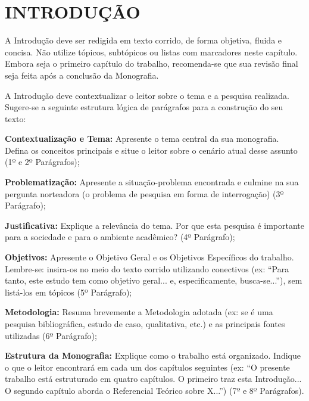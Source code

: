 \chapter{INTRODUÇÃO}
A Introdução deve ser redigida em texto corrido, de forma objetiva, fluida e concisa. Não utilize tópicos, subtópicos ou listas com marcadores neste capítulo. Embora seja o primeiro capítulo do trabalho, recomenda-se que sua revisão final seja feita após a conclusão da Monografia.

A Introdução deve contextualizar o leitor sobre o tema e a pesquisa realizada. Sugere-se a seguinte estrutura lógica de parágrafos para a construção do seu texto:
\begin{uemaenum}
    \item \textbf{Contextualização e Tema:} Apresente o tema central da sua monografia. Defina os conceitos principais e situe o leitor sobre o cenário atual desse assunto (1º e 2º Parágrafos);
    \item \textbf{Problematização:} Apresente a situação-problema encontrada e culmine na sua pergunta norteadora (o problema de pesquisa em forma de interrogação) (3º Parágrafo);
    \item \textbf{Justificativa:} Explique a relevância do tema. Por que esta pesquisa é importante para a sociedade e para o ambiente acadêmico? (4º Parágrafo);
    \item \textbf{Objetivos:} Apresente o Objetivo Geral e os Objetivos Específicos do trabalho. Lembre-se: insira-os no meio do texto corrido utilizando conectivos (ex: ``Para tanto, este estudo tem como objetivo geral... e, especificamente, busca-se...''), sem listá-los em tópicos (5º Parágrafo);
    \item \textbf{Metodologia:} Resuma brevemente a Metodologia adotada (ex: se é uma pesquisa bibliográfica, estudo de caso, qualitativa, etc.) e as principais fontes utilizadas (6º Parágrafo);
    \item \textbf{Estrutura da Monografia:} Explique como o trabalho está organizado. Indique o que o leitor encontrará em cada um dos capítulos seguintes (ex: ``O presente trabalho está estruturado em quatro capítulos. O primeiro traz esta Introdução... O segundo capítulo aborda o Referencial Teórico sobre X...'') (7º e 8º Parágrafos).
\end{uemaenum}
